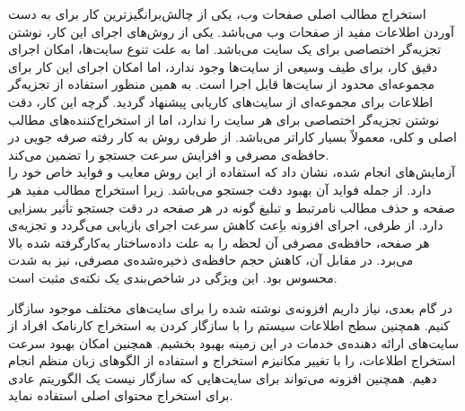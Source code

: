 
استخراج مطالب اصلی صفحات وب، یکی از چالش‌برانگیزترین کار برای به دست آوردن اطلاعات مفید از صفحات وب می‌باشد. یکی از روش‌های اجرای این کار، نوشتن تجزیه‌گر اختصاصی برای یک سایت می‌باشد. اما به علت تنوع سایت‌ها، امکان اجرای دقیق کار، برای طیف وسیعی از سایت‌ها وجود ندارد، اما امکان اجرای این کار برای مجموعه‌ای محدود از سایت‌ها قابل اجرا است. به همین منظور استفاده از تجزیه‌گر اطلاعات برای مجموعه‌ای از سایت‌های کاریابی پیشنهاد گردید. گرچه این کار، دقت نوشتن تجزیه‌گر اختصاصی برای هر سایت را ندارد، اما از استخراج‌کننده‌های مطالب اصلی و کلی، معمولاً بسیار کاراتر می‌باشد. از طرفی روش به کار رفته صرفه جویی در حافظه‌ی مصرفی و افزایش سرعت جستجو را تضمین می‌کند. 
\\
آزمایش‌های انجام شده، نشان داد که استفاده از این روش معایب و فواید خاص خود را دارد. از جمله فواید آن بهبود دقت جستجو می‌باشد. زیرا استخراج مطالب مفید هر صفحه و حذف مطالب نامرتبط و تبلیغ گونه در هر صفحه در دقت جستجو تأثیر بسزایی دارد. از طرفی، اجرای افزونه باِعث کاهش سرعت اجرای بازیابی می‌گردد و تجزیه‌ی هر صفحه، حافظه‌ی مصرفی آن لحظه را به علت داده‌ساختار به‌کارگرفته شده بالا می‌برد. در مقابل آن، کاهش حجم حافظه‌ی ذخیره‌شده‌ی مصرفی، نیز به شدت محسوس بود. این ویژگی در شاخص‌بندی یک نکته‌ی مثبت است. 

در گام بعدی، نیاز داریم افزونه‌ی نوشته شده را برای سایت‌های مختلف موجود سازگار کنیم. همچنین سطح اطلاعات سیستم را با سازگار کردن به استخراج کارنامک افراد از سایت‌های ارائه دهنده‌ی خدمات در این زمینه بهبود بخشیم. همچنین امکان بهبود سرعت استخراج اطلاعات، را با تغییر مکانیزم استخراج و استفاده از الگوهای زبان منظم انجام دهیم. همچنین افزونه می‌تواند برای سایت‌هایی که سازگار نیست یک الگوریتم عادی برای استخراج محتوای اصلی استفاده نماید.